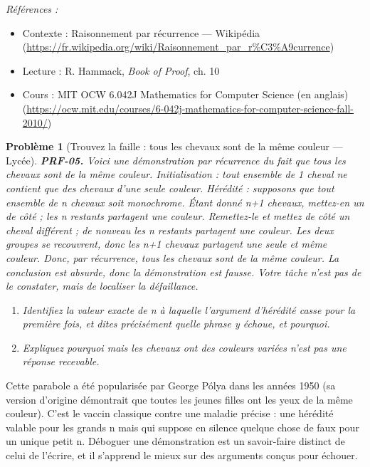 \documentclass[11pt]{article}
\newtheorem{problem}{Problème}
\newenvironment{refs}{\par\small\noindent\emph{Références :}\begin{itemize}\setlength\itemsep{0pt}}{\end{itemize}\normalsize}
\begin{document}
\begin{refs}
\item Contexte : Raisonnement par récurrence --- Wikipédia (\url{https://fr.wikipedia.org/wiki/Raisonnement_par_r%C3%A9currence})
\item Lecture : R. Hammack, \textit{Book of Proof}, ch. 10
\item Cours : MIT OCW 6.042J Mathematics for Computer Science (en anglais) (\url{https://ocw.mit.edu/courses/6-042j-mathematics-for-computer-science-fall-2010/})
\end{refs}

\bigskip

\begin{problem}[{Trouvez la faille : tous les chevaux sont de la même couleur --- Lycée}]
\textbf{PRF-05.} Voici une \og{} démonstration \fg{} par récurrence du fait que tous les
chevaux sont de la même couleur. \textit{Initialisation : tout ensemble de 1 cheval ne contient
que des chevaux d'une seule couleur. Hérédité : supposons que tout ensemble de n chevaux
soit monochrome. Étant donné n+1 chevaux, mettez-en un de côté ; les n restants partagent
une couleur. Remettez-le et mettez de côté un cheval différent ; de nouveau les n restants
partagent une couleur. Les deux groupes se recouvrent, donc les n+1 chevaux partagent une
seule et même couleur. Donc, par récurrence, tous les chevaux sont de la même couleur.}
La conclusion est absurde, donc la démonstration est fausse. Votre tâche n'est pas de le
constater, mais de localiser la défaillance.
\begin{enumerate}
\item[(a)] Identifiez la valeur exacte de n à laquelle l'argument d'hérédité casse pour la
première fois, et dites précisément quelle phrase y échoue, et pourquoi.
\item[(b)] Expliquez pourquoi \og{} mais les chevaux ont des couleurs variées \fg{} n'est pas une réponse
recevable.
\end{enumerate}

\end{problem}

\noindent Cette parabole a été popularisée par George Pólya dans les années 1950 (sa
version d'origine démontrait que toutes les jeunes filles ont les yeux de la même couleur).
C'est le vaccin classique contre une maladie précise : une hérédité valable pour les grands
n mais qui suppose en silence quelque chose de faux pour un unique petit n. Déboguer une
démonstration est un savoir-faire distinct de celui de l'écrire, et il s'apprend le mieux sur
des arguments conçus pour échouer.
\end{document}

